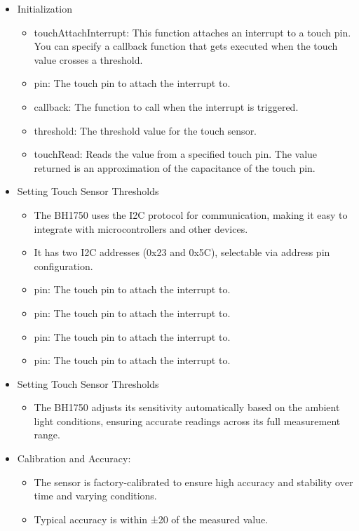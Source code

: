 \begin{itemize}
	\item Initialization
	\begin{itemize}
		\item touchAttachInterrupt: This function attaches an interrupt to a touch pin. You can specify a callback function that gets executed when the touch value crosses a threshold.
		\item pin: The touch pin to attach the interrupt to.
		\item callback: The function to call when the interrupt is triggered.
		\item threshold: The threshold value for the touch sensor.
		\item touchRead: Reads the value from a specified touch pin. The value returned is an approximation of the capacitance of the touch pin.
	\end{itemize}
	\item Setting Touch Sensor Thresholds
	\begin{itemize}
		\item The BH1750 uses the I2C protocol for communication, making it easy to integrate with microcontrollers and other devices.
		\item It has two I2C addresses (0x23 and 0x5C), selectable via address pin configuration.
		\item pin: The touch pin to attach the interrupt to.
		\item pin: The touch pin to attach the interrupt to.
		\item pin: The touch pin to attach the interrupt to.
		\item pin: The touch pin to attach the interrupt to.
	\end{itemize}
	
	\item Setting Touch Sensor Thresholds
	\begin{itemize}
		\item The BH1750 adjusts its sensitivity automatically based on the ambient light conditions, ensuring accurate readings across its full measurement range.
	\end{itemize}
	
	\item Calibration and Accuracy:
	\begin{itemize}
		\item The sensor is factory-calibrated to ensure high accuracy and stability over time and varying conditions.
		\item Typical accuracy is within ±20 of the measured value.
	\end{itemize}
\end{itemize}


